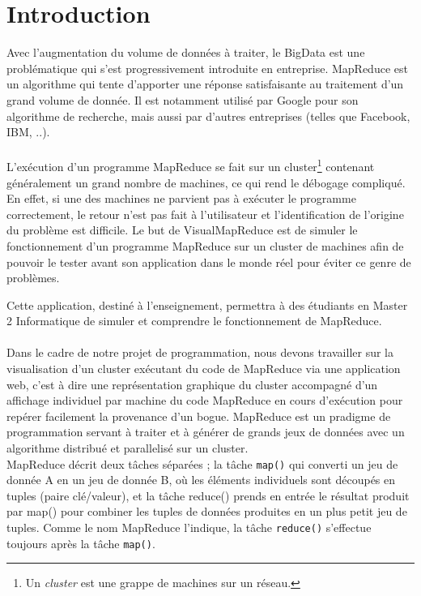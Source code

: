 \documentclass[12pt,a4paper]{article}
\begin{document}
\section{Introduction}
Avec l'augmentation du volume de données à traiter, le BigData est une problématique qui s'est progressivement introduite en entreprise.\cite{JoliaFerrierBigData} MapReduce est un algorithme qui tente d'apporter une réponse satisfaisante au traitement d'un grand volume de donnée. Il est notamment utilisé par Google pour son algorithme de recherche, mais aussi par d'autres entreprises (telles que Facebook, IBM, ..).
\paragraph{}
L'exécution d'un programme MapReduce se fait sur un cluster\footnote{Un \textit{cluster} est une grappe de machines sur un réseau.} contenant généralement un grand nombre de machines, ce qui rend le débogage compliqué. En effet, si une des machines ne parvient pas à exécuter le programme correctement, le retour n'est pas fait à l'utilisateur et l'identification de l'origine du problème est difficile.
Le but de VisualMapReduce est de simuler le fonctionnement d'un programme MapReduce sur un cluster de machines afin de pouvoir le tester avant son application dans le monde réel pour éviter ce genre de problèmes.

Cette application, destiné à l'enseignement, permettra à des étudiants en Master 2 Informatique de simuler et comprendre le fonctionnement de MapReduce.
\paragraph{}
Dans le cadre de notre projet de programmation, nous devons travailler sur la visualisation d'un cluster exécutant du code de MapReduce via une application web, c'est à dire une représentation graphique du cluster accompagné d'un affichage individuel par machine du code MapReduce en cours d'exécution pour repérer facilement la provenance d'un bogue.
MapReduce est un pradigme de programmation servant à traiter et à générer de grands jeux de données avec un algorithme distribué et parallelisé sur un cluster.\\
 MapReduce \cite{Bdpedia} décrit deux tâches séparées ; la tâche \texttt{map()} qui converti un jeu de donnée A en un jeu de donnée B, où les éléments individuels sont découpés en tuples (paire clé/valeur), et la tâche reduce() prends en entrée le résultat produit par map() pour combiner les tuples de données produites en un plus petit jeu de tuples.
Comme le nom MapReduce l'indique, la tâche \texttt{reduce()} s'effectue toujours après la tâche \texttt{map()}.
\end{document}
